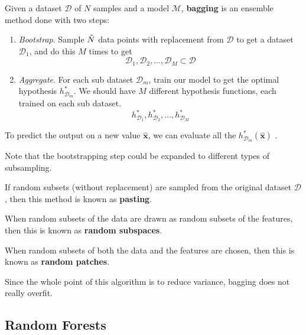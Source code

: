 \documentclass{article}
\begin{document}
  \begin{definition}
    Given a dataset $\mathcal{D}$ of $N$ samples and a model $\mathcal{M}$, \textbf{bagging} is an ensemble method done with two steps: 
    \begin{enumerate}
      \item \textit{Bootstrap}. Sample $\Tilde{N}$ data points with replacement from $\mathcal{D}$ to get a dataset $\mathcal{D}_1$, and do this $M$ times to get 
      \[\mathcal{D}_1, \mathcal{D}_2, \ldots, \mathcal{D}_M \subset \mathcal{D}\]
      \item \textit{Aggregate}. For each sub dataset $\mathcal{D}_m$, train our model to get the optimal hypothesis $h_{\mathcal{D}_m}^\ast$. We should have $M$ different hypothesis functions, each trained on each sub dataset. 
      \[h_{\mathcal{D}_1}^\ast, h_{\mathcal{D}_2}^\ast, \ldots, h_{\mathcal{D}_M}^\ast\]
    \end{enumerate}
    To predict the output on a new value $\hat{\mathbf{x}}$, we can evaluate all the $h_{\mathcal{D}_m}^\ast (\hat{\mathbf{x}})$ .
  \end{definition}

  Note that the bootstrapping step could be expanded to different types of subsampling. 

  \begin{definition}[Pasting]
    If random subsets (without replacement) are sampled from the original dataset $\mathcal{D}$, then this method is known as \textbf{pasting}. 
  \end{definition}

  \begin{definition}
    When random subsets of the data are drawn as random subsets of the features, then this is known as \textbf{random subspaces}. 
  \end{definition}

  \begin{definition}
    When random subsets of both the data and the features are chosen, then this is known as \textbf{random patches}. 
  \end{definition}

  Since the whole point of this algorithm is to reduce variance, bagging does not really overfit. 

  \subsection{Random Forests}
\end{document}
